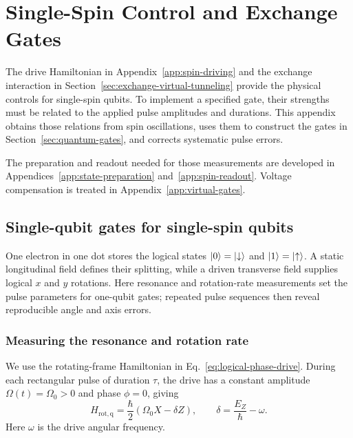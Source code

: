 \FloatBarrier
\section{Single-Spin Control and Exchange Gates}
\label{app:single-spin-control}
\label{chap:operation-calibration}

The drive Hamiltonian in Appendix~\ref{app:spin-driving} and the
exchange interaction in Section~\ref{sec:exchange-virtual-tunneling}
provide the physical controls for single-spin qubits. To implement a
specified gate, their strengths must be related to the applied pulse
amplitudes and durations. This appendix obtains those relations from
spin oscillations, uses them to construct the gates in
Section~\ref{sec:quantum-gates}, and corrects systematic pulse errors.

The preparation and readout needed for those measurements are developed
in Appendices~\ref{app:state-preparation} and~\ref{app:spin-readout}.
Voltage compensation is treated in Appendix~\ref{app:virtual-gates}.

\subsection{Single-qubit gates for single-spin qubits}
\label{sec:gate-calibration}
\label{sec:time-domain-spin-measurements}
\label{sec:spin-spectroscopy-dynamics}
\label{sec:measurement-zeeman-dynamics}

One electron in one dot stores the logical states
$\lvert 0\rangle=\lvert \downarrow\rangle$ and $\lvert 1\rangle=\lvert \uparrow\rangle$. A static
longitudinal field defines their splitting, while a driven transverse
field supplies logical $x$ and $y$ rotations. Here resonance and rotation-rate
measurements set the pulse parameters for one-qubit gates; repeated
pulse sequences then reveal reproducible angle and axis errors.

\subsubsection{Measuring the resonance and rotation rate}
\label{sec:measurement-spin-spectroscopy}
\label{sec:measurement-rabi}

We use the rotating-frame Hamiltonian in
Eq.~\eqref{eq:logical-phase-drive}. During each rectangular pulse
of duration $\tau$, the drive has a constant amplitude
$\Omega(t)=\Omega_0>0$ and phase $\phi=0$, giving
\begin{equation}
 H_{\mathrm{rot,q}}=\frac{\hbar}{2}(\Omega_0X-\delta Z),
 \qquad \delta=\frac{E_Z}{\hbar}-\omega.
 \label{eq:measurement-rabi-hamiltonian}
\end{equation}
Here $\omega$ is the drive angular frequency.

